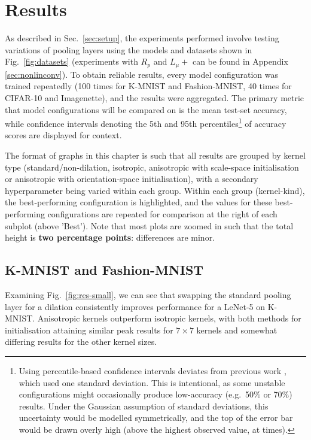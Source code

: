 \documentclass[a4paper, 12pt]{report}
\begin{document}
\chapter{Results}
\label{sec:results}
As described in Sec.\ \ref{sec:setup}, the experiments performed involve testing variations of pooling layers using the models and datasets shown in Fig.\ \ref{fig:datasets} (experiments with $R_p$ and $L_\mu+$ can be found in Appendix \ref{sec:nonlinconv}).
To obtain reliable results, every model configuration was trained repeatedly (100 times for K-MNIST and Fashion-MNIST, 40 times for CIFAR-10 and Imagenette), and the results were aggregated. The primary metric that model configurations will be compared on is the mean test-set accuracy, while confidence intervals denoting the 5th and 95th percentiles\footnote{Using percentile-based confidence intervals deviates from previous work \cite{thierrybsc, koenbsc}, which used one standard deviation. This is intentional, as some unstable configurations might occasionally produce low-accuracy (e.g.\ 50\% or 70\%) results. Under the Gaussian assumption of standard deviations, this uncertainty would be modelled symmetrically, and the top of the error bar would be drawn overly high (above the highest observed value, at times).} of accuracy scores are displayed for context.

The format of graphs in this chapter is such that all results are grouped by kernel type (standard/non-dilation, isotropic, anisotropic with scale-space initialisation or anisotropic with orientation-space initialisation), with a secondary hyperparameter being varied within each group. Within each group (kernel-kind), the best-performing configuration is highlighted, and the values for these best-performing configurations are repeated for comparison at the right of each subplot (above 'Best'). Note that most plots are zoomed in such that the total height is \textbf{two percentage points}: differences are minor.

\section{K-MNIST and Fashion-MNIST}
Examining Fig.\ \ref{fig:res-small}, we can see that swapping the standard pooling layer for a dilation consistently improves performance for a LeNet-5 on K-MNIST. Anisotropic kernels outperform isotropic kernels, with both methods for initialisation attaining similar peak results for $7\times7$ kernels and somewhat differing results for the other kernel sizes.
\end{document}
